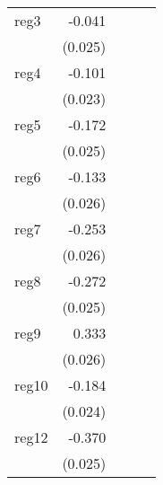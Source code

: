 {\begin{longtable}{l*{4}{D{.}{.}{-1}}}
\addlinespace
reg3        &      -0.041         &                     &                     &                     \\
            &     (0.025)         &                     &                     &                     \\
\addlinespace
reg4        &      -0.101\sym{***}&                     &                     &                     \\
            &     (0.023)         &                     &                     &                     \\
\addlinespace
reg5        &      -0.172\sym{***}&                     &                     &                     \\
            &     (0.025)         &                     &                     &                     \\
\addlinespace
reg6        &      -0.133\sym{***}&                     &                     &                     \\
            &     (0.026)         &                     &                     &                     \\
\addlinespace
reg7        &      -0.253\sym{***}&                     &                     &                     \\
            &     (0.026)         &                     &                     &                     \\
\addlinespace
reg8        &      -0.272\sym{***}&                     &                     &                     \\
            &     (0.025)         &                     &                     &                     \\
\addlinespace
reg9        &       0.333\sym{***}&                     &                     &                     \\
            &     (0.026)         &                     &                     &                     \\
\addlinespace
reg10       &      -0.184\sym{***}&                     &                     &                     \\
            &     (0.024)         &                     &                     &                     \\
\addlinespace
reg12       &      -0.370\sym{***}&                     &                     &                     \\
            &     (0.025)         &                     &                     &                     \\

\end{longtable}}
